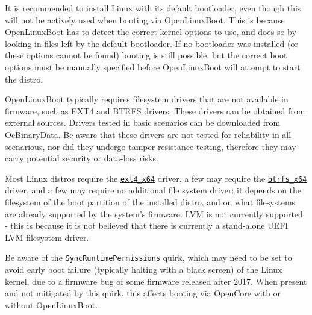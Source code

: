 \documentclass[]{article}
\begin{document}
It is recommended to install Linux with its default bootloader, even though this will not be actively used
when booting via OpenLinuxBoot. This is because OpenLinuxBoot has to detect the correct kernel options to
use, and does so by looking in files left by the default bootloader. If no bootloader was installed (or
these options cannot be found) booting is still possible, but the correct boot options must be manually
specified before OpenLinuxBoot will attempt to start the distro.

OpenLinuxBoot typically requires filesystem drivers that are not available in
firmware, such as EXT4 and BTRFS drivers. These drivers can be obtained from external sources.
Drivers tested in basic scenarios can be downloaded from \href{https://github.com/acidanthera/OcBinaryData}{OcBinaryData}.
Be aware that these drivers are not tested for reliability in all scenarious, nor did they undergo
tamper-resistance testing, therefore they may carry potential security or data-loss risks.

Most Linux distros require the \href{https://github.com/acidanthera/OcBinaryData}{\texttt{ext4\_x64}} driver,
a few may require the \href{https://github.com/acidanthera/OcBinaryData}{\texttt{btrfs\_x64}} driver, and a few
may require no additional file system driver: it depends on the filesystem of the boot partition of the installed
distro, and on what filesystems are already supported by the system's firmware. LVM is not currently
supported - this is because it is not believed that there is currently a stand-alone UEFI LVM filesystem driver.

Be aware of the \texttt{SyncRuntimePermissions} quirk, which may need to be set to avoid early boot
failure (typically halting with a black screen) of the Linux kernel, due to a firmware bug of some
firmware released after 2017. When present and not mitigated by this quirk, this affects booting
via OpenCore with or without OpenLinuxBoot.
\end{document}
